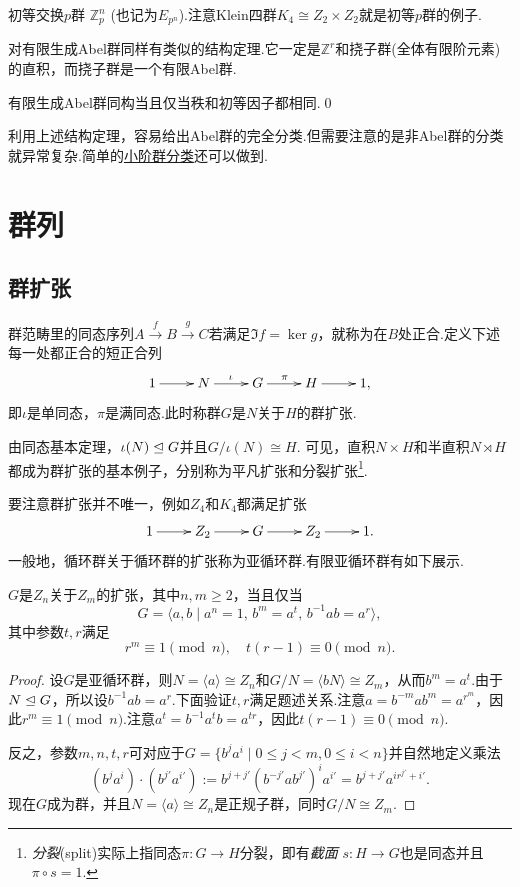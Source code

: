 {\heiti 初等交换$p$群} $\mathbb{Z}_p^n$ (也记为$E_{p^n}$).注意Klein四群$K_4\cong Z_2\times Z_2$就是初等$p$群的例子.

对有限生成Abel群同样有类似的结构定理.它一定是$\mathbb{Z}^r$和{\heiti 挠子群}(全体有限阶元素)的直积，而挠子群是一个有限Abel群.

\begin{thm}[(有限生成Abel群结构)]
	有限生成Abel群同构当且仅当秩和初等因子都相同.\qed
\end{thm}

利用上述结构定理，容易给出Abel群的完全分类.但需要注意的是非Abel群的分类就异常复杂.简单的\hyperref[subsec:ClassificationSmallOrder]{小阶群分类}还可以做到.

\section{群列}
\subsection{群扩张}\label{subsec:GroupExtension}
群范畴里的同态序列$A\overset{f}{\to} B\overset{g}{\to} C$若满足$\Im f=\ker g$，就称为在$B$处{\heiti 正合}.定义下述每一处都正合的{\heiti 短正合列}
\[
	\xymatrix{
		1\ar[r]&N\ar[r]^\iota&G\ar[r]^\pi&H\ar[r]&1,
	}
\]
即$\iota$是单同态，$\pi$是满同态.此时称群$G$是$N$关于$H$的{\heiti 群扩张}.

由同态基本定理，$\iota(N)\trianglelefteq G$并且$G/\iota(N)\cong H$.
可见，直积$N\times H$和半直积$N\rtimes H$都成为群扩张的基本例子，分别称为{\heiti 平凡扩张}和{\heiti 分裂扩张}\footnote{\emph{分裂}(split)实际上指同态$\pi\colon G\to H$分裂，即有\emph{截面} $s\colon H\to G$也是同态并且$\pi\circ s=1$.}.

要注意群扩张并不唯一，例如$Z_4$和$K_4$都满足扩张
\[
	\xymatrix{
		1\ar[r]&Z_2\ar[r]&G\ar[r]&Z_2\ar[r]&1.
	}
\]
一般地，循环群关于循环群的扩张称为{\heiti 亚循环群}.有限亚循环群有如下展示.
\begin{thm}[(H\"older)]
	$G$是$Z_n$关于$Z_m$的扩张，其中$n,m\ge 2$，当且仅当
	\[
		G=\langle a,b\mid a^n=1,\,b^m=a^t,\,b^{-1}ab=a^r\rangle ,
	\]
	其中参数$t,r$满足\hypertarget{thm:Metacyclic}{}
	\[
		r^m\equiv 1\pmod{n},\quad t(r-1)\equiv 0\pmod{n}.
	\]
\end{thm}
\begin{proof}
	设$G$是亚循环群，则$N=\langle a\rangle\cong Z_n$和$G/N=\langle bN\rangle \cong Z_m$，从而$b^m=a^t$.由于$N\trianglelefteq G$，所以设$b^{-1}ab=a^r$.下面验证$t,r$满足题述关系.注意$a=b^{-m}ab^m=a^{r^m}$，因此$r^m\equiv 1\pmod n$.注意$a^t=b^{-1}a^tb=a^{tr}$，因此$t(r-1)\equiv 0\pmod n$.

	反之，参数$m,n,t,r$可对应于$G=\{b^ja^i\mid 0\le j<m,0\le i<n\}$并自然地定义乘法
	\[
		(b^ja^i)\cdot (b^{j'}a^{i'}):=b^{j+j'}(b^{-j'}ab^{j'})^ia^{i'}=b^{j+j'}a^{ir^{j'}+i'}.
	\]
	现在$G$成为群，并且$N=\langle a\rangle\cong Z_n$是正规子群，同时$G/N\cong Z_m$.
\end{proof}

